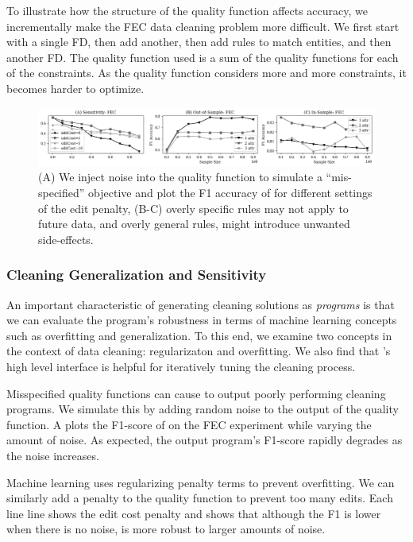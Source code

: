 To illustrate how the structure of the quality function affects accuracy, we incrementally make the FEC data cleaning problem more difficult.
We first start with a single FD, then add another, then add rules to match entities, and then another FD.
The quality function used is a sum of the quality functions for each of the constraints.
As the quality function considers more and more constraints, it becomes harder to optimize.

 \begin{figure}[ht]
\centering
 \includegraphics[width=\textwidth]{exp/exp5.png}
 \caption{ (A) We inject noise into the quality function to simulate a ``mis-specified'' objective and plot the F1 accuracy of \sys for different settings of the edit penalty, (B-C) overly specific rules may not apply to future data, and overly general rules, might introduce unwanted side-effects. 
 \label{fig:sensitivity}}
\end{figure}

\subsubsection{Cleaning Generalization and Sensitivity}
An important characteristic of generating cleaning solutions as {\it programs} is that we can evaluate the program's robustness in terms of machine learning concepts such as overfitting and generalization.    To this end, we examine two concepts in the context of data cleaning: regularizaton and overfitting.  We also find that \sys's high level interface is helpful for iteratively tuning the cleaning process.

  Misspecified quality functions can cause \sys to output poorly performing cleaning programs.  We simulate this by adding random noise to the output of the quality function. A plots the F1-score of \sys on the FEC experiment while varying the amount of noise.  As expected, the output program's F1-score rapidly degrades as the noise increases.  

Machine learning uses regularizing penalty terms to prevent overfitting.  We can similarly add a penalty to the quality function to prevent too many edits.  Each line line shows the edit cost penalty and shows that although the F1 is lower when there is no noise, \sys is more robust to larger amounts of noise. 

